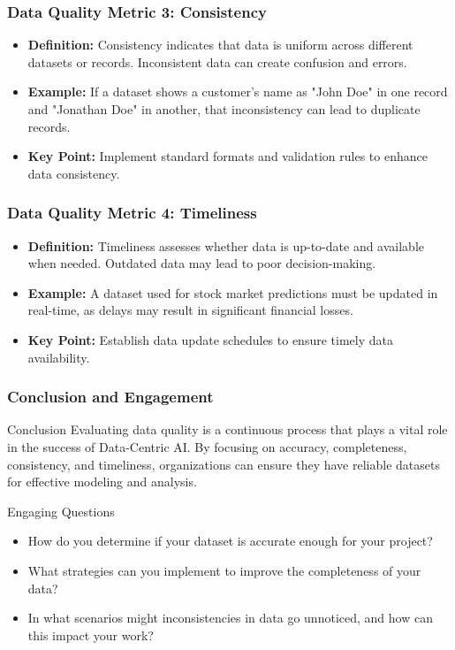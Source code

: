 \documentclass[aspectratio=169]{beamer}
\begin{document}
\begin{frame}[fragile]
    \frametitle{Data Quality Metric 3: Consistency}
    \begin{itemize}
        \item \textbf{Definition:} Consistency indicates that data is uniform across different datasets or records. Inconsistent data can create confusion and errors.
        \item \textbf{Example:} If a dataset shows a customer’s name as "John Doe" in one record and "Jonathan Doe" in another, that inconsistency can lead to duplicate records.
        \item \textbf{Key Point:} Implement standard formats and validation rules to enhance data consistency.
    \end{itemize}
\end{frame}

\begin{frame}[fragile]
    \frametitle{Data Quality Metric 4: Timeliness}
    \begin{itemize}
        \item \textbf{Definition:} Timeliness assesses whether data is up-to-date and available when needed. Outdated data may lead to poor decision-making.
        \item \textbf{Example:} A dataset used for stock market predictions must be updated in real-time, as delays may result in significant financial losses.
        \item \textbf{Key Point:} Establish data update schedules to ensure timely data availability.
    \end{itemize}
\end{frame}

\begin{frame}[fragile]
    \frametitle{Conclusion and Engagement}
    \begin{block}{Conclusion}
        Evaluating data quality is a continuous process that plays a vital role in the success of Data-Centric AI. By focusing on accuracy, completeness, consistency, and timeliness, organizations can ensure they have reliable datasets for effective modeling and analysis.
    \end{block}
    \begin{block}{Engaging Questions}
        \begin{itemize}
            \item How do you determine if your dataset is accurate enough for your project?
            \item What strategies can you implement to improve the completeness of your data?
            \item In what scenarios might inconsistencies in data go unnoticed, and how can this impact your work?
        \end{itemize}
    \end{block}
\end{frame}
\end{document}
